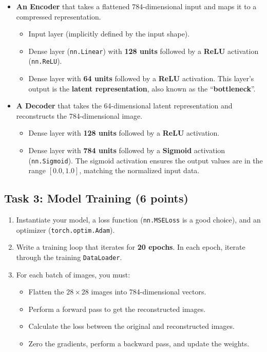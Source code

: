 \documentclass[
  letterpaper,
  DIV=11,
  numbers=noendperiod]{scrartcl}
\providecommand{\tightlist}{%
  \setlength{\itemsep}{0pt}\setlength{\parskip}{0pt}}\usepackage{longtable,booktabs,array}
\begin{document}
\begin{itemize}
\item
  \textbf{An Encoder} that takes a flattened 784-dimensional input and
  maps it to a compressed representation.

  \begin{itemize}
  \tightlist
  \item
    Input layer (implicitly defined by the input shape).
  \item
    Dense layer (\texttt{nn.Linear}) with \textbf{128 units} followed by
    a \textbf{ReLU} activation (\texttt{nn.ReLU}).
  \item
    Dense layer with \textbf{64 units} followed by a \textbf{ReLU}
    activation. This layer's output is the \textbf{latent
    representation}, also known as the ``\textbf{bottleneck}''.
  \end{itemize}
\item
  \textbf{A Decoder} that takes the 64-dimensional latent representation
  and reconstructs the 784-dimensional image.

  \begin{itemize}
  \tightlist
  \item
    Dense layer with \textbf{128 units} followed by a \textbf{ReLU}
    activation.
  \item
    Dense layer with \textbf{784 units} followed by a \textbf{Sigmoid}
    activation (\texttt{nn.Sigmoid}). The sigmoid activation ensures the
    output values are in the range \([0.0, 1.0]\), matching the
    normalized input data.
  \end{itemize}
\end{itemize}

\subsection{Task 3: Model Training (6
points)}\label{task-3-model-training-6-points}

\begin{enumerate}
\def\labelenumi{\arabic{enumi}.}
\tightlist
\item
  Instantiate your model, a loss function (\texttt{nn.MSELoss} is a good
  choice), and an optimizer (\texttt{torch.optim.Adam}).
\item
  Write a training loop that iterates for \textbf{20 epochs}. In each
  epoch, iterate through the training \texttt{DataLoader}.
\item
  For each batch of images, you must:

  \begin{itemize}
  \tightlist
  \item
    Flatten the \(28\times28\) images into 784-dimensional vectors.
  \item
    Perform a forward pass to get the reconstructed images.
  \item
    Calculate the loss between the original and reconstructed images.
  \item
    Zero the gradients, perform a backward pass, and update the weights.
  \end{itemize}
\end{enumerate}
\end{document}

